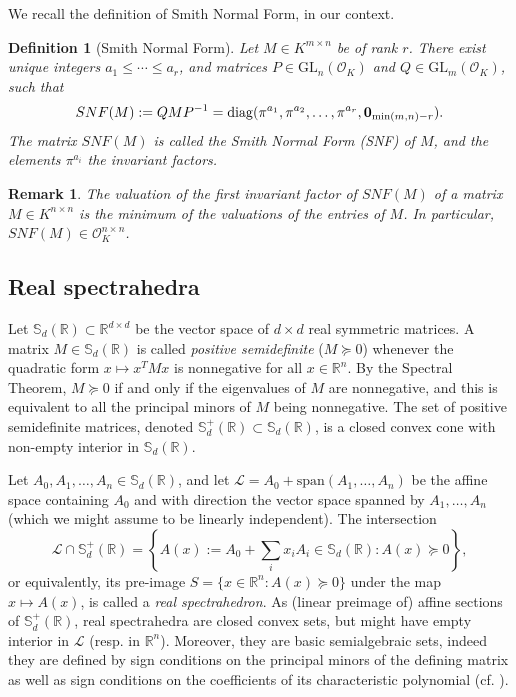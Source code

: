 \documentclass[a4paper,12pt]{article}
\newtheorem{definition}[theorem]{Definition}
\newtheorem{remark}[theorem]{Remark}
\newcommand{\R}{\mathbb{R}} %
\newcommand{\sym}{\mathbb{S}} %
\renewcommand{\span}[1]{{\text{span}(#1)}} %
\newcommand{\calL}{\mathcal{L}} %
\newcommand{\OK}{\mathcal{O}_K}
\def\diag{\mathrm{diag}}
\newcommand{\GL}{\mathrm{GL}}
\begin{document}
We recall the definition of Smith Normal Form, in our context.
\begin{definition}[Smith Normal Form]\label{smith_nf}
  Let $M \in K^{m \times n}$ be of rank $r$. There exist unique integers $a_1 \leq \cdots \leq a_r$, and
  matrices $P \in \GL_n(\OK)$ and $Q \in \GL_m(\OK)$, such that
  $$
  SNF(M) := QMP^{-1} = \diag(\pi^{a_1}, \pi^{a_2}, \ldots, \pi^{a_r}, {\bf 0}_{\min(m,n)-r}).
  $$
  The matrix $SNF(M)$ is called the \emph{Smith Normal Form (SNF)} of $M$, and the elements $\pi^{a_i}$ the
  \emph{invariant factors}.
\end{definition}
\begin{remark}
  The valuation of the first invariant factor of $SNF(M)$ of a matrix
  $M \in K^{n \times n}$ is the minimum of the valuations of the entries of
  $M$. In particular, $SNF(M) \in \OK^{n \times n}$.
\end{remark}


\subsection{Real spectrahedra}

Let $\sym_d(\R) \subset \R^{d\times d}$ be the vector space of $d \times d$ real symmetric
matrices. A matrix $M \in \sym_d(\R)$
is called \emph{positive semidefinite} ($M \succeq 0$) whenever the quadratic
form $x \mapsto x^TMx$ is nonnegative for all $x\in \R^n$. By the Spectral Theorem, $M \succeq 0$
if and only if the eigenvalues of $M$ are nonnegative, and this is equivalent to all the principal minors
of $M$ being nonnegative. The set of positive semidefinite matrices, denoted $\sym_d^+(\R) \subset \sym_d(\R)$,
is a closed convex cone with non-empty interior in $\sym_d(\R)$.

Let $A_0,A_1,\ldots,A_n \in \sym_d(\R)$, and let $\calL = A_0+\span{A_1,\ldots,A_n}$ be the affine space
containing $A_0$ and with direction the vector space spanned by $A_1,\ldots,A_n$ (which we might assume
to be linearly independent). The intersection
$$
\calL \cap \sym_d^+(\R) = \left\{A(x) := A_0+\sum_i x_i A_i \in \sym_d(\R) :
A(x) \succeq 0\right\},
$$
or equivalently, its pre-image $S = \{x \in \R^n : A(x) \succeq 0\}$ under the map $x \mapsto A(x)$, is called
a \emph{real spectrahedron}. As (linear preimage of) affine sections of $\sym_d^+(\R)$, real spectrahedra
are closed convex sets, but might have empty interior in $\calL$ (resp. in $\R^n$).
Moreover, they are basic semialgebraic sets, indeed they are defined by sign conditions on the principal
minors of the defining matrix as well as sign conditions on the coefficients of its characteristic polynomial
(cf. ).
\end{document}
